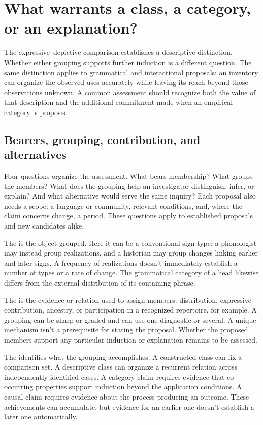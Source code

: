 \documentclass[12pt]{article}
\begin{document}
\section{What warrants a class, a category, or an explanation?}\label{sec:assessment}

The expressive--depictive comparison establishes a descriptive distinction.
Whether either grouping supports further induction is a different question.
The same distinction applies to grammatical and interactional proposals:
an inventory can organize the observed uses accurately while leaving
its reach beyond those observations unknown. A common assessment should
recognize both the value of that description and the additional commitment
made when an empirical category is proposed.

\subsection{Bearers, grouping, contribution, and alternatives}

Four questions organize the assessment. What bears membership? What groups
the members? What does the grouping help an investigator distinguish,
infer, or explain? And what alternative would serve the same inquiry?
Each proposal also needs a scope: a language or community, relevant
conditions, and, where the claim concerns change, a period. These
questions apply to established proposals and new candidates alike.

The  is the object grouped. Here it can be a conventional
sign-type; a phonologist may instead group realizations, and a historian
may group changes linking earlier and later signs. A frequency of
realizations doesn't immediately establish a number of types or a rate
of change. The grammatical category of a head likewise differs from
the external distribution of its containing phrase.

The  is the evidence or relation used to assign
members: distribution, expressive contribution, ancestry, or participation
in a recognized repertoire, for example. A grouping can be sharp or
graded and can use one diagnostic or several. A unique mechanism isn't
a prerequisite for stating the proposal. Whether the proposed members
support any particular induction or explanation remains to be assessed.

The  identifies what the grouping accomplishes. A
constructed class can fix a comparison set. A descriptive class can
organize a recurrent relation across independently identified cases.
A category claim requires evidence that co-occurring properties support
induction beyond the application conditions. A causal claim requires
evidence about the process producing an outcome. These achievements
can accumulate, but evidence for an earlier one doesn't establish a
later one automatically.
\end{document}

